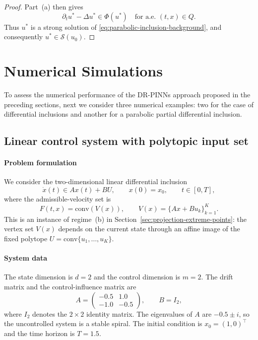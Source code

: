 \documentclass[11pt]{elsarticle}
\theoremstyle{definition}
\theoremstyle{remark}
\numberwithin{equation}{section}
\begin{document}
\begin{proof}
		Part~\textup{(a)} then gives
		\[
		\partial_tu^\ast-\Delta u^\ast
		\in\Phi(u^\ast)
		\quad\text{for a.e. }(t,x)\in Q.
		\]
		Thus $u^\ast$ is a strong solution of
		\eqref{eq:parabolic-inclusion-background}, and consequently $u^\ast\in\mathcal{S}(u_0)$.	
	\end{proof}


\section{Numerical Simulations}
\label{sec:numerics}
To assess the numerical performance of the DR-PINNs approach proposed in the preceding sections,
 next we consider three numerical examples: two for the case of differential inclusions and another for a parabolic partial differential inclusion. 
\subsection{Linear control system with polytopic input set}
\label{subsec:linear-control}

\paragraph{Problem formulation}
We consider the two-dimensional linear differential inclusion
\begin{equation}
  \label{eq:linear-control}
  \dot{x}(t) \in Ax(t) + BU,
  \qquad x(0) = x_0,
  \qquad t \in [0, T],
\end{equation}
where the admissible-velocity set is
\begin{equation}
  \label{eq:Fx-linear}
  F(t,x) = \mathrm{conv}(V(x)),
  \qquad
  V(x) = \{Ax + Bu_k\}_{k=1}^{K}.
\end{equation}
This is an instance of regime~(b) in Section~\ref{sec:projection-extreme-points}:
the vertex set $V(x)$ depends on the current state through an affine image of
the fixed polytope $U = \mathrm{conv}\{u_1,\dots,u_K\}$.

\paragraph{System data}
The state dimension is $d = 2$ and the control dimension is $m = 2$.
The drift matrix and the control-influence matrix are
\begin{equation}
  \label{eq:AB-matrices}
  A =
  \begin{pmatrix}
    -0.5 &  1.0 \\
    -1.0 & -0.5
  \end{pmatrix},
  \qquad
  B = I_2,
\end{equation}
where $I_2$ denotes the $2\times 2$ identity matrix.
The eigenvalues of $A$ are $-0.5 \pm i$, so the uncontrolled system is a
stable spiral.
The initial condition is $x_0 = (1, 0)^\top$ and the time horizon is $T = 1.5$.
\end{document}
